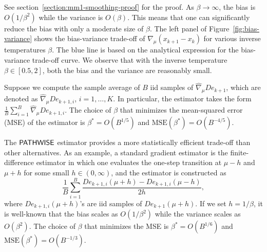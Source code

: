 See section~\ref{section:mm1-smoothing-proof} for the proof.
As $\beta \to \infty$, the bias is $O(1/\beta^{2})$ while the variance is $O(\beta)$. This means that one can significantly reduce the bias with only a moderate size of $\beta$. The left panel of Figure~\ref{fig:bias-variance} shows the bias-variance trade-off of $\widehat{\nabla}_\mu (x_{k+1} - x_{k})$ for various inverse temperatures $\beta$. The blue line is based on the analytical expression for the bias-variance trade-off curve. We observe that with the inverse temperature $\beta \in [0.5, 2]$, both the bias and the variance are reasonably small.



\begin{corollary}
\label{cor:one-step-mse}
Suppose we compute the sample average of $B$ iid samples of $\widehat{\nabla}_{\mu} De_{k+1}$, which are denoted as $\widehat{\nabla}_{\mu} De_{k+1, i}$, $i=1,\dots, K$. In particular, the estimator takes the form $\frac{1}{B}\sum_{i=1}^{B} \widehat{\nabla}_{\mu} De_{k+1,i}$. The choice of $\beta$ that minimizes the mean-squared error (MSE) of the estimator 
is $\beta^{*} = O(B^{1/5})$ and $\text{MSE}(\beta^*)=O(B^{-4/5})$.
\end{corollary}



The $\mathsf{PATHWISE}$ estimator provides a more statistically efficient trade-off than other alternatives. As an example, a standard gradient estimator is the finite-difference estimator in which one evaluates the one-step transition at $\mu - h$ and $\mu + h$ for some small $h \in (0,\infty)$, and the estimator is constructed as
\[
\frac{1}{B}\sum_{i=1}^{B} \frac{De_{k+1,i}(\mu + h) - De_{k+1,i}(\mu - h)}{2h},
\]
where $De_{k+1,i}(\mu + h)$'s are iid samples of $De_{k+1}(\mu + h)$.
If we set $h = 1/\beta$, it is well-known that the bias scales as $O(1/\beta^{2})$ while the variance scales as $O(\beta^{2})$. The choice of $\beta$ that minimizes the MSE is $\beta^{*} = O(B^{1/6})$ and $\text{MSE}(\beta^*)=O(B^{-1/3})$.

